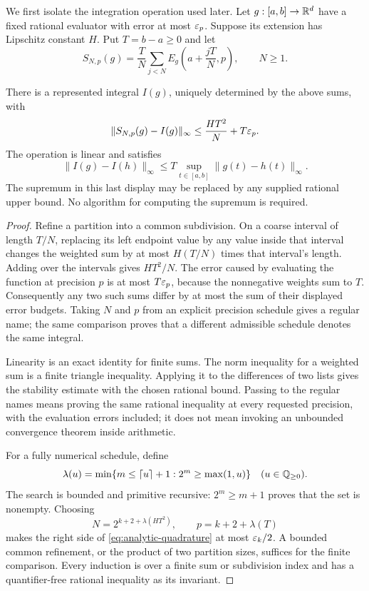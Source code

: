 We first isolate the integration operation used later.  Let $g:[a,b]\to\mathbb R^d$ have a fixed rational evaluator with error at most $\varepsilon_p$.  Suppose its extension has Lipschitz constant $H$.  Put $T=b-a\ge0$ and let
\[
 S_{N,p}(g)=\frac{T}{N}\sum_{j<N}
 E_g\left(a+\frac{jT}{N},p\right),\qquad N\ge1.
\]

\begin{lemma}
\label{lem:analytic-quadrature}
There is a represented integral $I(g)$, uniquely determined by the above sums, with
\begin{equation}
 \|S_{N,p}(g)-I(g)\|_\infty
 \le \frac{HT^2}{N}+T\varepsilon_p.\label{eq:analytic-quadrature}
\end{equation}
The operation is linear and satisfies
\begin{equation}
 \|I(g)-I(h)\|_\infty\le T\sup_{t\in[a,b]}\|g(t)-h(t)\|_\infty.\label{eq:analytic-integral-stability}
\end{equation}
The supremum in this last display may be replaced by any supplied rational upper bound.  No algorithm for computing the supremum is required.
\end{lemma}

\begin{proof}
Refine a partition into a common subdivision.  On a coarse interval of length $T/N$, replacing its left endpoint value by any value inside that interval changes the weighted sum by at most $H(T/N)$ times that interval's length.  Adding over the intervals gives $HT^2/N$.  The error caused by evaluating the function at precision $p$ is at most $T\varepsilon_p$, because the nonnegative weights sum to $T$.  Consequently any two such sums differ by at most the sum of their displayed error budgets.  Taking $N$ and $p$ from an explicit precision schedule gives a regular name; the same comparison proves that a different admissible schedule denotes the same integral.

Linearity is an exact identity for finite sums.  The norm inequality for a weighted sum is a finite triangle inequality.  Applying it to the differences of two lists gives the stability estimate with the chosen rational bound.  Passing to the regular names means proving the same rational inequality at every requested precision, with the evaluation errors included; it does not mean invoking an unbounded convergence theorem inside arithmetic.

For a fully numerical schedule, define
\[
 \lambda(u)=\min\{m\le\lceil u\rceil+1:2^m\ge\max(1,u)\}
 \quad(u\in\mathbb Q_{\ge0}).
\]
The search is bounded and primitive recursive: $2^m\ge m+1$ proves that the set is nonempty.  Choosing
\[
 N=2^{k+2+\lambda(HT^2)},\qquad
 p=k+2+\lambda(T)
\]
makes the right side of \eqref{eq:analytic-quadrature} at most $\varepsilon_k/2$.  A bounded common refinement, or the product of two partition sizes, suffices for the finite comparison.  Every induction is over a finite sum or subdivision index and has a quantifier-free rational inequality as its invariant.
\end{proof}

